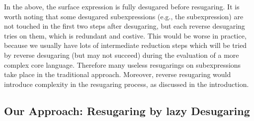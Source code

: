 In the above, the surface expression is fully desugared before resugaring. It is worth noting that some desugared subexpressions (e.g., the  subexpression) are not touched in the first two steps after desugaring, but each reverse desugaring tries on them, which is redundant and costive. This would be worse in practice, because we usually have lots of intermediate reduction steps which will be tried by reverse desugaring (but  may not succeed) during the evaluation of a more complex core language. Therefore many useless resugarings on subexpressions take place in the traditional approach. Moreover, reverse resugaring would introduce complexity in the resugaring process, as discussed in the introduction.

\subsection{Our Approach: Resugaring by lazy Desugaring}

